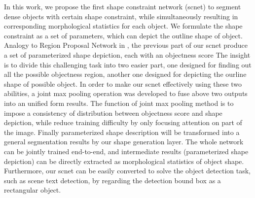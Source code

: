 \documentclass[10pt,twocolumn,letterpaper]{article}
\begin{document}
In this work, we propose the first shape constraint network (scnet) to segment dense objects with certain shape constraint, while simultaneously resulting in corresponding morphological statistics for each object.
We formulate the shape constraint as a set of parameters, which can depict the outline shape of object.
Analogy to Region Proposal Network in \cite{Ren2015}, the previous part of our scnet produce a set of parameterized shape depiction, each with an objectness score
The insight is to divide this challenging task into two easier part, one designed for finding out all the possible objectness region, another one designed for depicting the ourline shape of possible object.
In order to make our scnet effectively using these two abilities, a joint max pooling operation was developed to fuse above two outputs into an unified form results.
The function of joint max pooling method is to impose a consistency of distribution between objectness score and shape depiction, while reduce training difficulty by only focusing attention on part of the image.
Finally parameterized shape description will be transformed into a general segmentation results by our shape generation layer.
The whole network can be jointly trained end-to-end, and intermediate results (parameterized shape depiction) can be directly extracted as morphological statistics of object shape.
Furthermore, our scnet can be easily converted to solve the object detection task, such as scene text detection, by regarding the detection bound box as a rectangular object.



\end{document}
